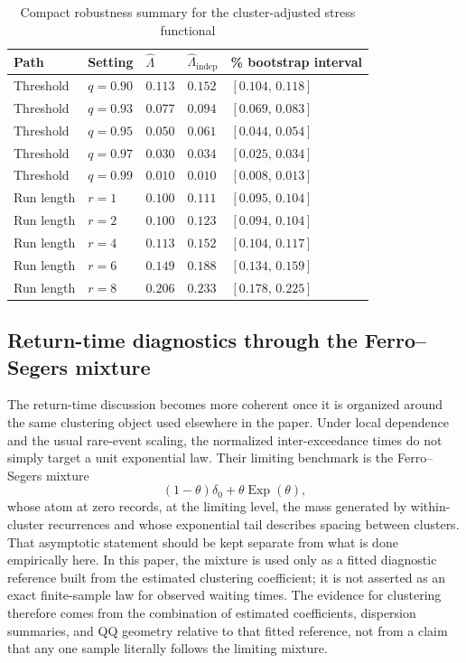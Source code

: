 \documentclass[11pt]{article}
\begin{document}
\begin{table}[H]
\centering
\caption{Compact robustness summary for the cluster-adjusted stress functional}
\label{tab:lambda_robustness}
\small
\begin{tabular}{>{\raggedright\arraybackslash}p{} >{\raggedleft\arraybackslash}p{} >{\raggedleft\arraybackslash}p{} >{\raggedleft\arraybackslash}p{} >{\raggedleft\arraybackslash}p{}}
\toprule
Path & Setting & $\widehat{\Lambda}$ & $\widehat{\Lambda}_{\mathrm{indep}}$ & 90\% bootstrap interval \\
\midrule
Threshold & $q=0.90$ & $0.113$ & $0.152$ & $[0.104,\,0.118]$ \\
Threshold & $q=0.93$ & $0.077$ & $0.094$ & $[0.069,\,0.083]$ \\
Threshold & $q=0.95$ & $0.050$ & $0.061$ & $[0.044,\,0.054]$ \\
Threshold & $q=0.97$ & $0.030$ & $0.034$ & $[0.025,\,0.034]$ \\
Threshold & $q=0.99$ & $0.010$ & $0.010$ & $[0.008,\,0.013]$ \\
Run length & $r=1$ & $0.100$ & $0.111$ & $[0.095,\,0.104]$ \\
Run length & $r=2$ & $0.100$ & $0.123$ & $[0.094,\,0.104]$ \\
Run length & $r=4$ & $0.113$ & $0.152$ & $[0.104,\,0.117]$ \\
Run length & $r=6$ & $0.149$ & $0.188$ & $[0.134,\,0.159]$ \\
Run length & $r=8$ & $0.206$ & $0.233$ & $[0.178,\,0.225]$ \\
\bottomrule
\end{tabular}
\normalsize
\end{table}

\subsection{Return-time diagnostics through the Ferro--Segers mixture}

The return-time discussion becomes more coherent once it is organized around the same clustering object used elsewhere in the paper. Under local dependence and the usual rare-event scaling, the normalized inter-exceedance times do not simply target a unit exponential law. Their limiting benchmark is the Ferro--Segers mixture
\[
(1-\theta)\delta_0 + \theta \operatorname{Exp}(\theta),
\]
whose atom at zero records, at the limiting level, the mass generated by within-cluster recurrences and whose exponential tail describes spacing between clusters. That asymptotic statement should be kept separate from what is done empirically here. In this paper, the mixture is used only as a fitted diagnostic reference built from the estimated clustering coefficient; it is not asserted as an exact finite-sample law for observed waiting times. The evidence for clustering therefore comes from the combination of estimated coefficients, dispersion summaries, and QQ geometry relative to that fitted reference, not from a claim that any one sample literally follows the limiting mixture.
\end{document}
